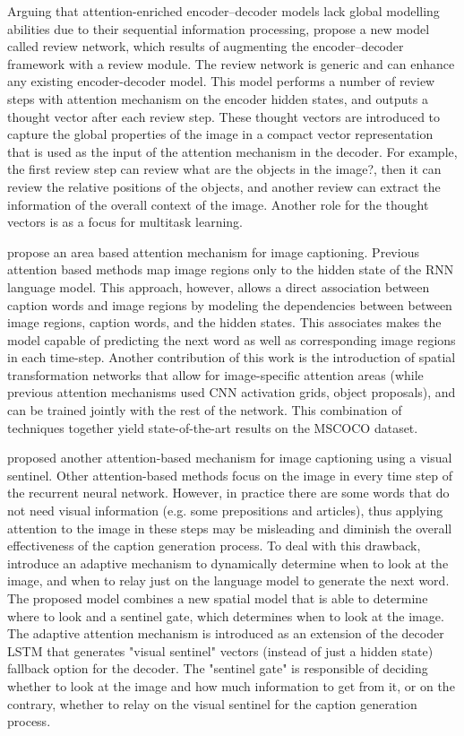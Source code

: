 Arguing that attention-enriched encoder–decoder models lack global modelling abilities due to their sequential information processing, \citet{Yang2016_RevNet} propose a new model called review network, which results of augmenting the encoder–decoder framework with a review module. The review network is generic and can enhance any existing encoder-decoder model.
This model performs a number of review steps with attention mechanism on the encoder hidden states, and outputs a thought vector after each review step. These thought vectors are introduced to capture the global properties of the image in a compact vector representation that is used as the input of the attention mechanism in the decoder. For example, the first review step can review what are the objects in the image?, then it can review the relative positions of the objects, and another review can extract the information of the overall context of the image. Another role for the thought vectors is as a focus for multitask learning.

\citet{Pedersoli2017} propose an area based attention mechanism for image captioning. Previous attention based methods map image regions only to the hidden state of the RNN language model. This approach, however, allows a direct association between caption words and image regions by modeling the dependencies between between image regions, caption words, and the hidden states. This associates makes the model capable of predicting the next word as well as corresponding image regions in each time-step. Another contribution of this work is the introduction of spatial transformation networks that allow for image-specific attention areas (while previous attention mechanisms used CNN activation grids, object proposals), and can be trained jointly with the rest of the network. This combination of techniques together yield state-of-the-art results on the MSCOCO dataset.

\citet{Lu2017} proposed another attention-based mechanism for image captioning using a visual sentinel. Other attention-based methods focus on the image in every time step of the recurrent neural network. However, in practice there are some words that do not need visual information (e.g. some prepositions and articles), thus applying attention to the image in these steps may be misleading and diminish the overall effectiveness of the caption generation process. To deal with this drawback, \citeauthor{Lu2017} introduce an adaptive mechanism to dynamically determine when to look at the image, and when to relay just on the language model to generate the next word. The proposed model combines a new spatial model that is able to determine where to look and a sentinel gate, which determines when to look at the image. The adaptive attention mechanism is introduced as an extension of the decoder LSTM that generates "visual sentinel" vectors (instead of just a hidden state) fallback option for the decoder. The "sentinel gate" is responsible of deciding whether to look at the image and how much information to get from it, or on the contrary, whether to relay on the visual sentinel for the caption generation process.

